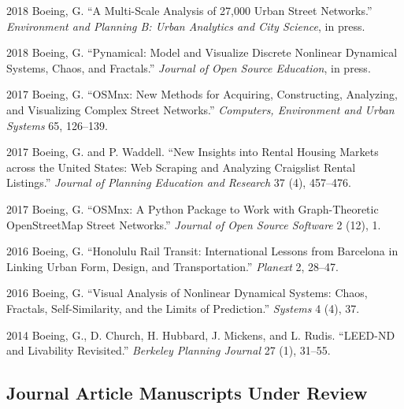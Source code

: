 \documentclass{academiccv}
\begin{document}
\begin{tablist}
	
\item[2018] \tab Boeing, G. \enquote{A Multi-Scale Analysis of 27,000 Urban Street Networks.} \textit{Environment and Planning B: Urban Analytics and City Science}, in press.

\item[2018] \tab Boeing, G. \enquote{Pynamical: Model and Visualize Discrete Nonlinear Dynamical Systems, Chaos, and Fractals.} \textit{Journal of Open Source Education}, in press.

\item[2017] \tab Boeing, G. \enquote{OSMnx: New Methods for Acquiring, Constructing, Analyzing, and Visualizing Complex Street Networks.} \textit{Computers, Environment and Urban Systems} 65, 126--139.

\item[2017] \tab Boeing, G. and P. Waddell. \enquote{New Insights into Rental Housing Markets across the United States: Web Scraping and Analyzing Craigslist Rental Listings.} \textit{Journal of Planning Education and Research} 37 (4), 457--476.

\item[2017] \tab Boeing, G. \enquote{OSMnx: A Python Package to Work with Graph-Theoretic OpenStreetMap Street Networks.} \textit{Journal of Open Source Software} 2 (12), 1.

\item[2016] \tab Boeing, G. \enquote{Honolulu Rail Transit: International Lessons from Barcelona in Linking Urban Form, Design, and Transportation.} \textit{Planext} 2, 28--47.

\item[2016] \tab Boeing, G. \enquote{Visual Analysis of Nonlinear Dynamical Systems: Chaos, Fractals, Self-Similarity, and the Limits of Prediction.} \textit{Systems} 4 (4), 37.

\item[2014] \tab Boeing, G., D. Church, H. Hubbard, J. Mickens, and L. Rudis. \enquote{LEED-ND and Livability Revisited.} \textit{Berkeley Planning Journal} 27 (1), 31--55.

\end{tablist}



\subsection*{Journal Article Manuscripts Under Review}
\end{document}
